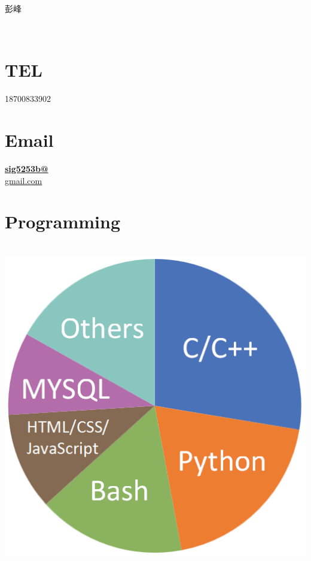 \documentclass[]{friggeri-cv}
\begin{document}
      { 彭峰 } 



\begin{aside}
    ~
    ~
  \section{TEL}
    18700833902
    ~
  \section{Email}
    \href{mailto:sig5253b@gmail.com}{\textbf{sig5253b@}\\gmail.com}
    ~
  \section{Programming}
  ~
    \includegraphics[scale=0.25]{img/programming3.png}
  ~

\end{aside}
\end{document}

